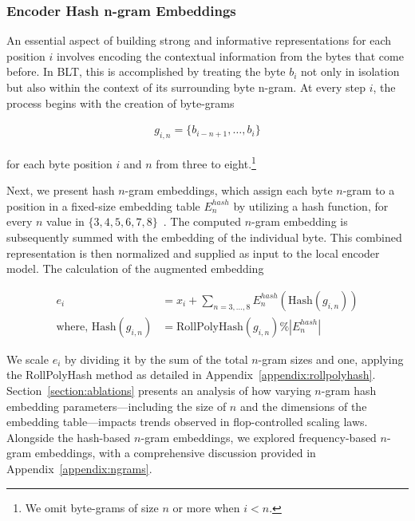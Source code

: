 \subsubsection{Encoder Hash n-gram Embeddings}
\label{sec:ngram-emb}
\label{sec:hash-emb}
An essential aspect of building strong and informative representations for each position $i$ involves encoding the contextual information from the bytes that come before. In {\textsc BLT}, this is accomplished by treating the byte $b_i$ not only in isolation but also within the context of its surrounding byte n-gram. At every step $i$, the process begins with the creation of byte-grams

\begin{align}
    g_{i,n}=\{b_{i-n + 1},\ldots, b_i\}
\end{align}

for each byte position $i$ and $n$ from three to eight.\footnote{
We omit byte-grams of size $n$ or more when $i<n$. }

Next, we present hash $n$-gram embeddings, which assign each byte $n$-gram to a position in a fixed-size embedding table $E_{n}^{hash}$ by utilizing a hash function, for every $n$ value in $\{3,4,5,6,7,8\}$~\citep{bai2010learning}. The computed $n$-gram embedding is subsequently summed with the embedding of the individual byte. This combined representation is then normalized and supplied as input to the local encoder model. The calculation of the augmented embedding

\begin{align}
e_i &= x_i + \sum_{n = 3,...,8}E_{n}^{hash}(\text{Hash}(g_{i,n})) \\
\text{where, Hash}(g_{i,n}) &= \text{RollPolyHash}(g_{i,n}) \% |E_{n}^{hash}|
\end{align}

We scale $e_i$ by dividing it by the sum of the total $n$-gram sizes and one, applying the RollPolyHash method as detailed in Appendix~\ref{appendix:rollpolyhash}. Section~\ref{section:ablations} presents an analysis of how varying $n$-gram hash embedding parameters—including the size of $n$ and the dimensions of the embedding table—impacts trends observed in flop-controlled scaling laws. Alongside the hash-based $n$-gram embeddings, we explored frequency-based $n$-gram embeddings, with a comprehensive discussion provided in Appendix~\ref{appendix:ngrams}.

